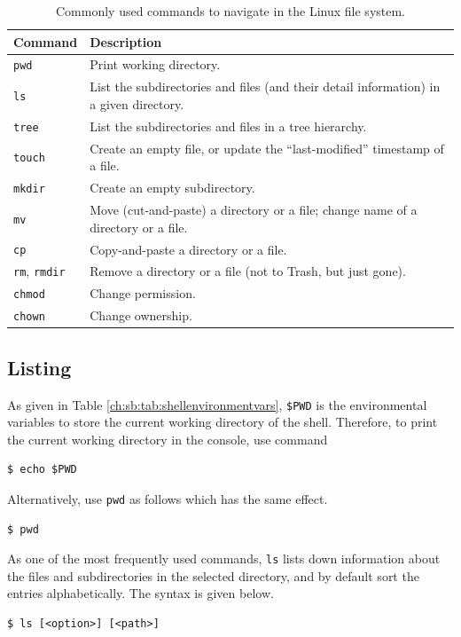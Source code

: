 \begin{table}[!htb]
  \centering \caption{Commonly used commands to navigate in the Linux file system.}\label{ch:fm:tab:commonfilecommands}
  \begin{tabularx}{\textwidth}{lX}
    \hline
    Command & Description \\ \hline
    \verb|pwd| & Print working directory. \\ 
    \verb|ls| & List the subdirectories and files (and their detail information) in a given directory. \\ 
    \verb|tree| & List the subdirectories and files in a tree hierarchy. \\  
    \verb|touch| & Create an empty file, or update the ``last-modified'' timestamp of a file. \\ 
    \verb|mkdir| & Create an empty subdirectory. \\ 
    \verb|mv| & Move (cut-and-paste) a directory or a file; change name of a directory or a file. \\ 
    \verb|cp| & Copy-and-paste a directory or a file. \\ 
    \verb|rm|, \verb|rmdir| & Remove a directory or a file (not to Trash, but just gone). \\ 
    \verb|chmod| & Change permission. \\ 
    \verb|chown| & Change ownership. \\
    \hline
  \end{tabularx}
\end{table}

\subsection{Listing}

As given in Table \ref{ch:sb:tab:shellenvironmentvars}, \verb|$PWD| is the environmental variables to store the current working directory of the shell. Therefore, to print the current working directory in the console, use command 
\begin{lstlisting}
$ echo $PWD
\end{lstlisting}
Alternatively, use \verb|pwd| as follows which has the same effect.
\begin{lstlisting}
$ pwd
\end{lstlisting}

As one of the most frequently used commands, \verb|ls| lists down information about the files and subdirectories in the selected directory, and by default sort the entries alphabetically. The syntax is given below.
\begin{lstlisting}
$ ls [<option>] [<path>]
\end{lstlisting}

